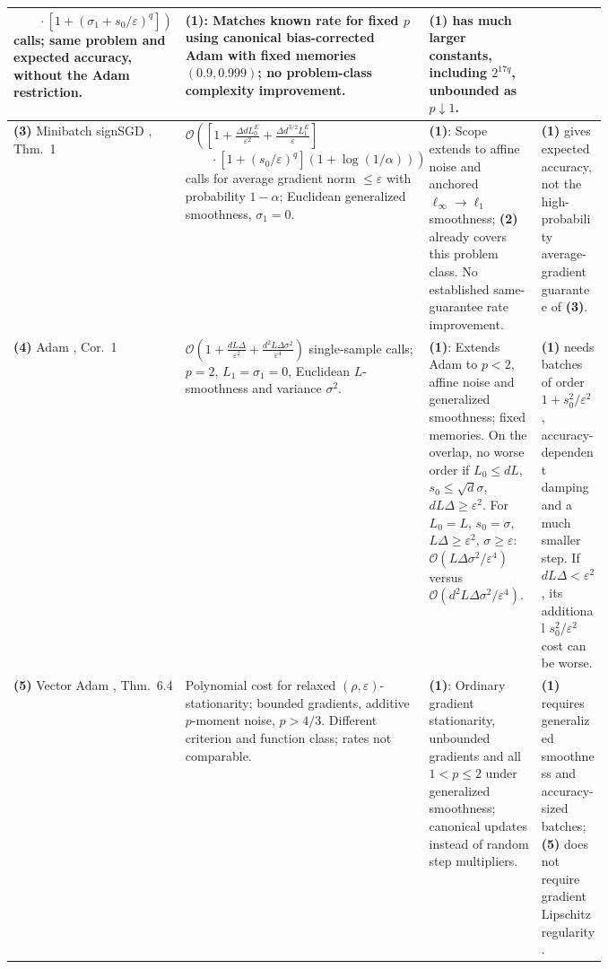 \begin{table}[tp]
\begin{threeparttable}
\begin{tabularx}{\linewidth}{@{}>{\raggedright\arraybackslash}p{0.20\linewidth}>{\raggedright\arraybackslash}p{0.32\linewidth}>{\raggedright\arraybackslash}p{0.25\linewidth}>{\raggedright\arraybackslash}X@{}}
$\left.\qquad\cdot[1+(\sigma_1+s_0/\varepsilon)^q]\right)$ calls; same problem and expected accuracy, without the Adam restriction.
& \textbf{(1)}: Matches known rate for fixed $p$ using canonical bias-corrected Adam with fixed memories $(0.9,0.999)$; no problem-class complexity improvement.
& \textbf{(1)} has much larger constants, including $2^{17q}$, unbounded as $p\downarrow1$. \\
\midrule
\textbf{(3)} Minibatch signSGD \citep{ahtaKornilov2025v2}, Thm.~1
& $\mathcal O\!\left(\left[1+\frac{\Delta dL_0^E}{\varepsilon^2}+\frac{\Delta d^{3/2}L_1^E}{\varepsilon}\right]\right.$\newline
$\left.\qquad\cdot[1+(s_0/\varepsilon)^q](1+\log(1/\alpha))\right)$ calls for average gradient norm $\le\varepsilon$ with probability $1-\alpha$; Euclidean generalized smoothness, $\sigma_1=0$.
& \textbf{(1)}: Scope extends to affine noise and anchored $\ell_\infty\!\to\!\ell_1$ smoothness; \textbf{(2)} already covers this problem class. No established same-guarantee rate improvement.
& \textbf{(1)} gives expected accuracy, not the high-probability average-gradient guarantee of \textbf{(3)}. \\
\midrule
\textbf{(4)} Adam \citep{ahtaLiDongLin2026v4}, Cor.~1
& $\mathcal O\!\left(1+\frac{dL\Delta}{\varepsilon^2}+\frac{d^2L\Delta\sigma^2}{\varepsilon^4}\right)$ single-sample calls; $p=2$, $L_1=\sigma_1=0$, Euclidean $L$-smoothness and variance $\sigma^2$.
& \textbf{(1)}: Extends Adam to $p<2$, affine noise and generalized smoothness; fixed memories. On the overlap, no worse order if $L_0\le dL$, $s_0\le\sqrt d\sigma$, $dL\Delta\ge\varepsilon^2$. For $L_0=L$, $s_0=\sigma$, $L\Delta\ge\varepsilon^2$, $\sigma\ge\varepsilon$: $\mathcal O(L\Delta\sigma^2/\varepsilon^4)$ versus $\mathcal O(d^2L\Delta\sigma^2/\varepsilon^4)$.
& \textbf{(1)} needs batches of order $1+s_0^2/\varepsilon^2$, accuracy-dependent damping and a much smaller step. If $dL\Delta<\varepsilon^2$, its additional $s_0^2/\varepsilon^2$ cost can be worse. \\
\midrule
\textbf{(5)} Vector Adam \citep{htaPang2026}, Thm.~6.4
& Polynomial cost for relaxed $(\rho,\varepsilon)$-stationarity; bounded gradients, additive $p$-moment noise, $p>4/3$. Different criterion and function class; rates not comparable.
& \textbf{(1)}: Ordinary gradient stationarity, unbounded gradients and all $1<p\le2$ under generalized smoothness; canonical updates instead of random step multipliers.
& \textbf{(1)} requires generalized smoothness and accuracy-sized batches; \textbf{(5)} does not require gradient Lipschitz regularity. \\

\end{tabularx}
\end{threeparttable}
\end{table}
